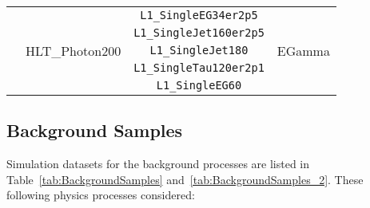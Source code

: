 \begin{table}[h]
\begin{tabular}{l l c c}
                               & \multirow{5}{*}{HLT\_Photon200}                           & \texttt{L1\_SingleEG34er2p5}    & \multirow{5}{*}{EGamma}       \\
                               &                                                           & \texttt{L1\_SingleJet160er2p5}  &                               \\
                               &                                                           & \texttt{L1\_SingleJet180}       &                               \\
                               &                                                           & \texttt{L1\_SingleTau120er2p1}  &                               \\
                               &                                                           & \texttt{L1\_SingleEG60}         &                               \\\hline

        \hline\hline %
    \end{tabular}

    \label{tab:triggers}
\end{table}

\subsection{Background Samples}

Simulation datasets for the background processes are listed in
Table~\ref{tab:BackgroundSamples} and~\ref{tab:BackgroundSamples_2}. These following physics processes considered:


